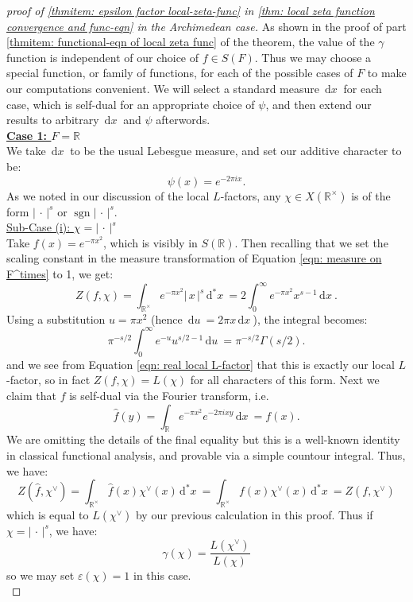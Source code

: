 \documentclass[11pt, x11names]{article}
\newcommand{\rr}{\mathbb{R}}
\newcommand{\abs}[1]{\left| \, #1  \,\right|}
\renewcommand{\hat}{\widehat}
\DeclareMathOperator{\sgn}{sgn}
\newcommand{\du}{\, \mathrm{d}u \ }
\newcommand{\dx}{\, \mathrm{d}x \ }
\renewcommand{\d}[1]{\, \mathrm{d}#1 \ }
\begin{document}
\begin{proof}[proof of \ref{thmitem: epsilon factor local-zeta-func} in \ref{thm: local zeta function convergence and func-eqn} in the Archimedean case]
As shown in the proof of part \ref{thmitem: functional-eqn of local zeta func} of the theorem, the value of the $\gamma$ function is independent of our choice of $f \in S(F)$. Thus we may choose a special function, or family of functions, for each of the possible cases of $F$ to make our computations convenient. We will select a standard measure $\dx$ for each case, which is self-dual for an appropriate choice of $\psi$, and then extend our results to arbitrary $\dx$ and $\psi$ afterwords.\\

\textbf{\underline{Case 1: $F = \rr$}}\\
We take $\dx$ to be the usual Lebesgue measure, and set our additive character to be:
\begin{equation*}
    \psi(x) = e^{- 2 \pi i x}.
\end{equation*}
As we noted in our discussion of the local $L$-factors, any $\chi \in X(\rr^\times)$ is of the form $\abs{\cdot}^s$ or $\sgn \abs{\cdot}^s$.\\

\underline{Sub-Case (i): $\chi = \abs{\cdot}^s$}\\
Take $f(x) = e^{- \pi x^2}$, which is visibly in $S(\rr)$. Then recalling that we set the scaling constant in the measure transformation of Equation \ref{eqn: measure on F^times} to 1, we get:
\begin{equation*}
    Z(f, \chi) = \int_{\rr^\times} e^{-\pi x^2} \abs{x}^s \d{^*x} = 2 \int^\infty_0 e^{-\pi x^2} x^{s-1} \dx.
\end{equation*}
Using a substitution $u = \pi x^2$ (hence $\du = 2 \pi x \dx$),  the integral becomes:
\begin{equation*}
    \pi^{-s/2} \int^\infty_0 e^{-u} u^{s/2 - 1} \du = \pi^{-s/2} \Gamma(s/2).
\end{equation*}
and we see from Equation \ref{eqn: real local L-factor} that this is exactly our local $L$-factor, so in fact $Z(f, \chi) = L(\chi)$ for all characters of this form. Next we claim that $f$ is self-dual via the Fourier transform, i.e.
\begin{equation*}
    \hat{f}(y) = \int_\rr e^{-\pi x^2} e^{-2 \pi i xy} \dx = f(x).
\end{equation*}
We are omitting the details of the final equality but this is a well-known identity in classical functional analysis, and provable via a simple countour integral. Thus, we have:
\begin{equation*}
    Z(\hat{f}, \chi^\lor) = \int_{\rr^\times} \hat{f}(x) \chi^\lor(x) \d{^*x} = \int_{\rr^\times} f(x) \chi^\lor(x) \d{^*x} = Z(f, \chi^\lor)
\end{equation*}
which is equal to $L(\chi^\lor)$ by our previous calculation in this proof. Thus if $\chi = \abs{\cdot}^s$, we have:
\begin{equation*}
    \gamma(\chi) = \frac{L(\chi^\lor)}{L(\chi)}
\end{equation*}
so we may set $\varepsilon(\chi) = 1$ in this case.\\


\end{proof}
\end{document}
